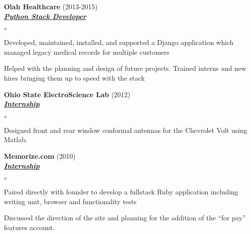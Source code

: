 \documentclass{article}
\newcommand{\employer}[3]{{ \textbf{#1} (#2)\\ \underline{\textbf{\emph{#3}}}\\  }}
\newenvironment{achievements}{\begin{list}{$\circ$}{\topsep 0pt \itemsep -2pt}}{\vspace*{4pt}\end{list}}
\begin{document}
\employer{Olah Healthcare}{2013-2015}{Python Stack Developer}
	\begin{achievements}
	\item Developed, maintained, installed, and supported a Django application which managed legacy medical records for multiple
	      customers
	\item Helped with the planning and design of future projects. Trained interns and new hires bringing them up to
		  speed with the stack
	\end{achievements}

\employer{Ohio State ElectroScience Lab}{2012}{Internship}
	\begin{achievements}
	\item Designed front and rear window conformal antennas for the Chevrolet Volt using Matlab.
	\end{achievements}

\employer{Memorize.com}{2010}{Internship}
	\begin{achievements}
	\item Paired directly with founder to develop a fullstack Ruby application including writing
	      unit, browser and functionality tests
	\item Discussed the direction of the site and planning
          for the addition of the ``for pay'' features
	account.
	\end{achievements}
\end{document}
